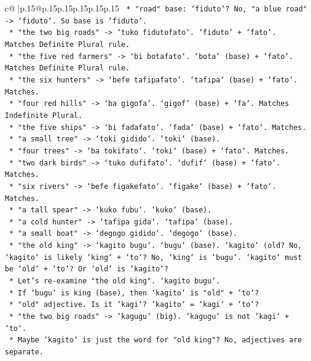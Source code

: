 \documentclass{article}
\begin{document}
{\begin{supertabular}{c@{$\;$}|p{.15\linewidth}@{}p{.15\linewidth}p{.15\linewidth}p{.15\linewidth}p{.15\linewidth}p{.15\linewidth}}
{{{\texttt{        *   "road" base: `fiduto`? No, "a blue road" {-}> `fiduto`. So base is `fiduto`.} \\
\texttt{        *   "the two big roads" {-}> `tuko fidutofato`. `fiduto` + `fato`. Matches Definite Plural rule.} \\
\texttt{        *   "the five red farmers" {-}> `bi botafato`. `bota` (base) + `fato`. Matches Definite Plural rule.} \\
\texttt{        *   "the six hunters" {-}> `befe tafipafato`. `tafipa` (base) + `fato`. Matches.} \\
\texttt{        *   "four red hills" {-}> `ba gigofa`. `gigof` (base) + `fa`. Matches Indefinite Plural.} \\
\texttt{        *   "the five ships" {-}> `bi fadafato`. `fada` (base) + `fato`. Matches.} \\
\texttt{        *   "a small tree" {-}> `toki gidido`. `toki` (base).} \\
\texttt{        *   "four trees" {-}> `ba tokifato`. `toki` (base) + `fato`. Matches.} \\
\texttt{        *   "two dark birds" {-}> `tuko dufifato`. `dufif` (base) + `fato`. Matches.} \\
\texttt{        *   "six rivers" {-}> `befe figakefato`. `figake` (base) + `fato`. Matches.} \\
\texttt{        *   "a tall spear" {-}> `kuko fubu`. `kuko` (base).} \\
\texttt{        *   "a cold hunter" {-}> `tafipa gida`. `tafipa` (base).} \\
\texttt{        *   "a small boat" {-}> `degogo gidido`. `degogo` (base).} \\
\texttt{        *   "the old king" {-}> `kagito bugu`. `bugu` (base). `kagito` (old? No, `kagito` is likely `king` + `to`? No, `king` is `bugu`. `kagito` must be `old` + `to`? Or `old` is `kagito`?} \\
\texttt{        *   Let's re{-}examine "the old king". `kagito bugu`.} \\
\texttt{        *   If `bugu` is king (base), then `kagito` is "old" + `to`?} \\
\texttt{        *   "old" adjective. Is it `kagi`? `kagito` = `kagi` + `to`?} \\
\texttt{        *   "the two big roads" {-}> `kagugu` (big). `kagugu` is not `kagi` + `to`.} \\
\texttt{        *   Maybe `kagito` is just the word for "old king"? No, adjectives are separate.} \\
}}}
\end{supertabular}}
\end{document}
